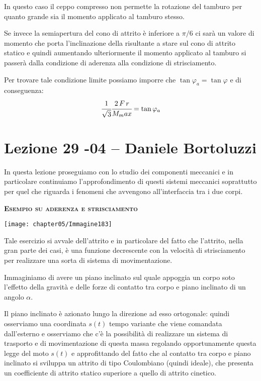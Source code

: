 In questo caso il ceppo compresso non permette la rotazione del tamburo per quanto grande sia il momento applicato al tamburo stesso.

Se invece la semiapertura del cono di attrito è inferiore a $\pi/6$ ci sarà un valore di momento che porta l'inclinazione della risultante a stare sul cono di attrito statico e quindi aumentando ulteriormente il momento applicato al tamburo si passerà dalla condizione di aderenza alla condizione di strisciamento.

Per trovare tale condizione limite possiamo imporre che $\tan{\varphi_a} = \tan{\varphi}$ e di conseguenza:
\[\cfrac{1}{\sqrt{3}}{\cfrac{2\,F\,r}{M_max}} = \tan{\varphi_a}\]

\section{Lezione 29	-04 -- Daniele Bortoluzzi}

In questa lezione proseguiamo con lo studio dei componenti meccanici e in particolare continuiamo l'approfondimento di questi sistemi meccanici soprattutto per quel che riguarda i fenomeni che avvengono all'interfaccia tra i due corpi.

\begin{center}
{\scshape{\bfseries Esempio su aderenza e strisciamento}}
\end{center}

\begin{minipage}{.35\textwidth}
\centering
\texttt{[image: chapter05/Immagine183]}
\end{minipage}
\hfill
\begin{minipage}{.65\textwidth}
Tale esercizio si avvale dell'attrito e in particolare del fatto che l'attrito, nella gran parte dei casi, è una funzione decrescente con la velocità di strisciamento per realizzare una sorta di sistema di movimentazione.

Immaginiamo di avere un piano inclinato sul quale appoggia un corpo soto l'effetto della gravità e delle forze di contatto tra corpo e piano inclinato di un angolo $\alpha$.
\end{minipage}
\vspace{1mm}

Il piano inclinato è azionato lungo la direzione ad esso ortogonale: quindi osserviamo una coordinata $s(t)$ tempo variante che viene comandata dall'esterno e osserviamo che c'è la possibilità di realizzare un sistema di trasporto e di movimentazione di questa massa regolando opportunamente questa legge del moto $s(t)$ e approfittando del fatto che al contatto tra corpo e piano inclinato si sviluppa un attrito di tipo Coulombiano (quindi ideale), che presenta un coefficiente di attrito statico superiore a quello di attrito cinetico.

